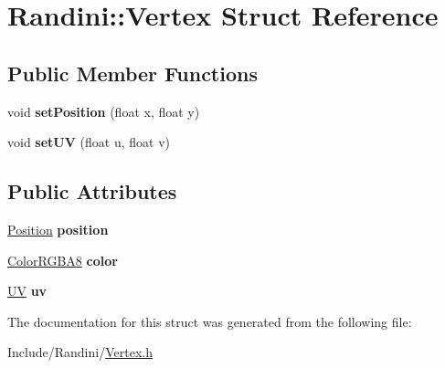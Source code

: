 \hypertarget{structRandini_1_1Vertex}{
\section{Randini::Vertex Struct Reference}
\label{structRandini_1_1Vertex}
}
\subsection*{Public Member Functions}
\begin{DoxyCompactItemize}
\item 
\hypertarget{structRandini_1_1Vertex_ad00ffb3af37c668d40f28ae2d8cce41b}{
void {\bfseries setPosition} (float x, float y)}
\label{structRandini_1_1Vertex_ad00ffb3af37c668d40f28ae2d8cce41b}

\item 
\hypertarget{structRandini_1_1Vertex_a1433f80829a7d1c3486ac9ef669e3e76}{
void {\bfseries setUV} (float u, float v)}
\label{structRandini_1_1Vertex_a1433f80829a7d1c3486ac9ef669e3e76}

\end{DoxyCompactItemize}
\subsection*{Public Attributes}
\begin{DoxyCompactItemize}
\item 
\hypertarget{structRandini_1_1Vertex_ae5335415f2c18745710786492093b37c}{
\hyperlink{structRandini_1_1Position}{Position} {\bfseries position}}
\label{structRandini_1_1Vertex_ae5335415f2c18745710786492093b37c}

\item 
\hypertarget{structRandini_1_1Vertex_a47ba3de5e86302c30d50051d840cd4a9}{
\hyperlink{structRandini_1_1ColorRGBA8}{ColorRGBA8} {\bfseries color}}
\label{structRandini_1_1Vertex_a47ba3de5e86302c30d50051d840cd4a9}

\item 
\hypertarget{structRandini_1_1Vertex_a72d59c20270fb7777ae6e0457fe6d1b9}{
\hyperlink{structRandini_1_1UV}{UV} {\bfseries uv}}
\label{structRandini_1_1Vertex_a72d59c20270fb7777ae6e0457fe6d1b9}

\end{DoxyCompactItemize}


The documentation for this struct was generated from the following file:\begin{DoxyCompactItemize}
\item 
Include/Randini/\hyperlink{Vertex_8h}{Vertex.h}\end{DoxyCompactItemize}
